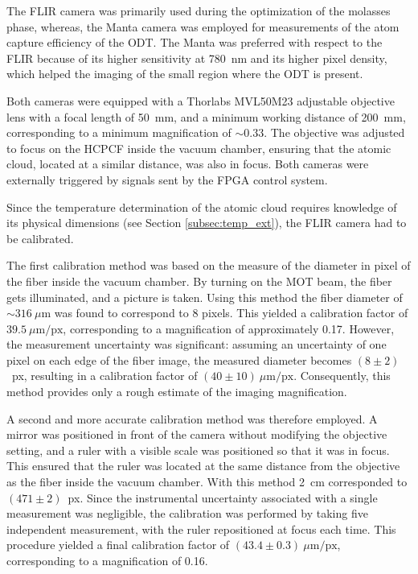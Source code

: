 The FLIR camera was primarily used during the optimization of the molasses phase, whereas, the Manta camera was employed for measurements of the atom capture efficiency of the ODT. The Manta was preferred with respect to the FLIR because of its higher sensitivity at 780~nm and its higher pixel density, which helped the imaging of the small region where the ODT is present.

Both cameras were equipped with a Thorlabs MVL50M23 adjustable objective lens with a focal length of 50~mm, and a minimum working distance of 200~mm, corresponding to a minimum magnification of $\sim 0.33$. The objective was adjusted to focus on the HCPCF inside the vacuum chamber, ensuring that the atomic cloud, located at a similar distance, was also in focus. Both cameras were externally triggered by signals sent by the FPGA control system.

Since the temperature determination of the atomic cloud requires knowledge of its physical dimensions (see Section \ref{subsec:temp_ext}), the FLIR camera had to be calibrated.

The first calibration method was based on the measure of the diameter in pixel of the fiber inside the vacuum chamber. By turning on the MOT beam, the fiber gets illuminated, and a picture is taken. Using this method the fiber diameter of $\sim 316~\mu\mathrm{m}$ was found to correspond to 8 pixels. This yielded a calibration factor of $39.5~\mu\mathrm{m}/\mathrm{px}$, corresponding to a magnification of approximately 0.17. However, the measurement uncertainty was significant: assuming an uncertainty of one pixel on each edge of the fiber image, the measured diameter becomes $(8\pm2)$~px, resulting in a calibration factor of $(40\pm10)~\mu\mathrm{m}/\mathrm{px}$. Consequently, this method provides only a rough estimate of the imaging magnification.

A second and more accurate calibration method was therefore employed. A mirror was positioned in front of the camera without modifying the objective setting, and a ruler with a visible scale was positioned so that it was in focus. This ensured that the ruler was located at the same distance from the objective as the fiber inside the vacuum chamber. With this method 2~cm corresponded to $(471\pm2)$~px. Since the instrumental uncertainty associated with a single measurement was negligible, the calibration was performed by taking five independent measurement, with the ruler repositioned at focus each time. This procedure yielded a final calibration factor of $(43.4\pm0.3)~\mu\mathrm{m}/\mathrm{px}$, corresponding to a magnification of 0.16.

